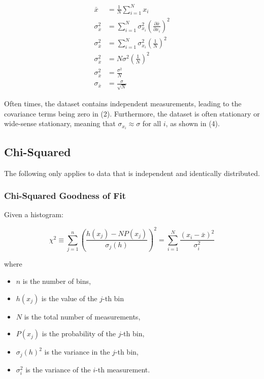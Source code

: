 \begin{align*}
    \bar{x}            & = \frac{1}{N} \sum_{i=1}^N x_i                                                             \\
    \sigma_{\bar{x}}^2 & = \sum_{i=1}^N \sigma_{x_i}^2 \left(\frac{\partial \bar{x}}{\partial x_i}\right)^2 \tag{2} \\
    \sigma_{\bar{x}}^2 & = \sum_{i=1}^N \sigma_{x_i}^2 \left(\frac{1}{N}\right)^2                                   \\
    \sigma_{\bar{x}}^2 & = N \sigma^2 \left(\frac{1}{N}\right)^2               \tag {4}                             \\
    \sigma_{\bar{x}}^2 & = \frac{\sigma^2}{N}                                                                       \\
    \sigma_{\bar{x}}   & = \frac{\sigma}{\sqrt{N}}
\end{align*}

Often times, the dataset contains independent measurements, leading to the covariance terms being zero in (2). Furthermore, the dataset is often stationary or wide-sense stationary, meaning that $\sigma_{x_i} \approx \sigma$ for all $i$, as shown in (4).

\subsection{Chi-Squared}

The following only applies to data that is independent and identically distributed.

\subsubsection{Chi-Squared Goodness of Fit}

Given a histogram:

\begin{equation*}
    \chi^2 \equiv \sum_{j=1}^{n} \left(\frac{h(x_j) - NP(x_j)}{\sigma_j(h)}\right)^2 = \sum_{i=1}^{N} \frac{(x_i - \bar{x})^2}{\sigma_i^2}
\end{equation*}

where

\begin{itemize}
    \item $n$ is the number of bins,
    \item $h(x_j)$ is the value of the $j$-th bin
    \item $N$ is the total number of measurements,
    \item $P(x_j)$ is the probability of the $j$-th bin,
    \item $\sigma_j(h)^2$ is the variance in the $j$-th bin,
    \item $\sigma_i^2$ is the variance of the $i$-th measurement.
\end{itemize}

